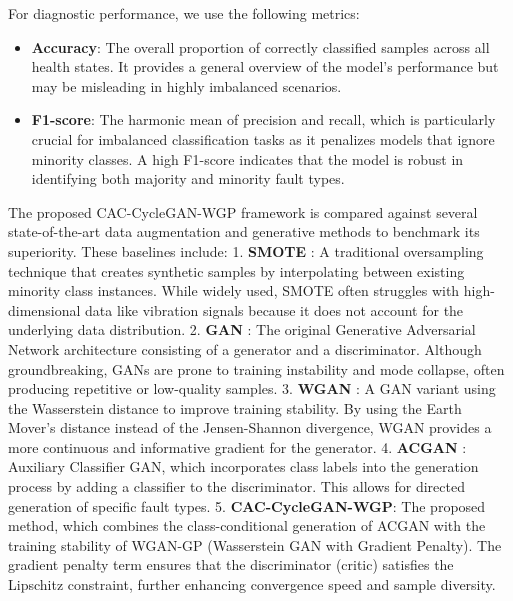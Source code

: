 \documentclass[conference,twocolumn]{IEEEtran}
\begin{document}
For diagnostic performance, we use the following metrics:
\begin{itemize}
    \item \textbf{Accuracy}: The overall proportion of correctly classified samples across all health states. It provides a general overview of the model's performance but may be misleading in highly imbalanced scenarios.
    \item \textbf{F1-score}: The harmonic mean of precision and recall, which is particularly crucial for imbalanced classification tasks as it penalizes models that ignore minority classes. A high F1-score indicates that the model is robust in identifying both majority and minority fault types.
\end{itemize}

The proposed CAC-CycleGAN-WGP framework is compared against several state-of-the-art data augmentation and generative methods to benchmark its superiority. These baselines include:
1. \textbf{SMOTE} \cite{6}: A traditional oversampling technique that creates synthetic samples by interpolating between existing minority class instances. While widely used, SMOTE often struggles with high-dimensional data like vibration signals because it does not account for the underlying data distribution.
2. \textbf{GAN} \cite{1}: The original Generative Adversarial Network architecture consisting of a generator and a discriminator. Although groundbreaking, GANs are prone to training instability and mode collapse, often producing repetitive or low-quality samples.
3. \textbf{WGAN} \cite{2}: A GAN variant using the Wasserstein distance to improve training stability. By using the Earth Mover's distance instead of the Jensen-Shannon divergence, WGAN provides a more continuous and informative gradient for the generator.
4. \textbf{ACGAN} \cite{5}: Auxiliary Classifier GAN, which incorporates class labels into the generation process by adding a classifier to the discriminator. This allows for directed generation of specific fault types.
5. \textbf{CAC-CycleGAN-WGP}: The proposed method, which combines the class-conditional generation of ACGAN with the training stability of WGAN-GP (Wasserstein GAN with Gradient Penalty). The gradient penalty term ensures that the discriminator (critic) satisfies the Lipschitz constraint, further enhancing convergence speed and sample diversity.
\end{document}
